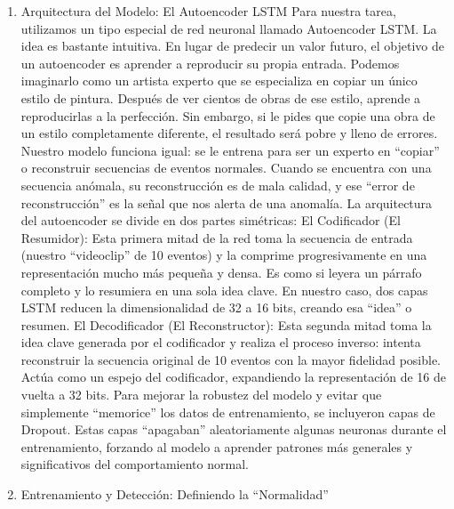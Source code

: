 \begin{enumerate}
\begin{enumerate}
                  \item Arquitectura del Modelo: El Autoencoder LSTM
                        Para nuestra tarea, utilizamos un tipo especial de red neuronal llamado Autoencoder LSTM. La idea es bastante intuitiva. En lugar de predecir un valor futuro, el objetivo de un autoencoder es aprender a reproducir su propia entrada.
                        Podemos imaginarlo como un artista experto que se especializa en copiar un único estilo de pintura. Después de ver cientos de obras de ese estilo, aprende a reproducirlas a la perfección. Sin embargo, si le pides que copie una obra de un estilo completamente diferente, el resultado será pobre y lleno de errores.
                        Nuestro modelo funciona igual: se le entrena para ser un experto en ``copiar'' o reconstruir secuencias de eventos normales. Cuando se encuentra con una secuencia anómala, su reconstrucción es de mala calidad, y ese ``error de reconstrucción'' es la señal que nos alerta de una anomalía.
                        La arquitectura del autoencoder se divide en dos partes simétricas:
                        El Codificador (El Resumidor): Esta primera mitad de la red toma la secuencia de entrada (nuestro ``videoclip'' de 10 eventos) y la comprime progresivamente en una representación mucho más pequeña y densa. Es como si leyera un párrafo completo y lo resumiera en una sola idea clave. En nuestro caso, dos capas LSTM reducen la dimensionalidad de 32 a 16 bits, creando esa ``idea'' o resumen.
                        El Decodificador (El Reconstructor): Esta segunda mitad toma la idea clave generada por el codificador y realiza el proceso inverso: intenta reconstruir la secuencia original de 10 eventos con la mayor fidelidad posible. Actúa como un espejo del codificador, expandiendo la representación de 16 de vuelta a 32 bits.
                        Para mejorar la robustez del modelo y evitar que simplemente ``memorice'' los datos de entrenamiento, se incluyeron capas de Dropout. Estas capas ``apagaban'' aleatoriamente algunas neuronas durante el entrenamiento, forzando al modelo a aprender patrones más generales y significativos del comportamiento normal.

                  \item Entrenamiento y Detección: Definiendo la ``Normalidad''


\end{enumerate}
\end{enumerate}
